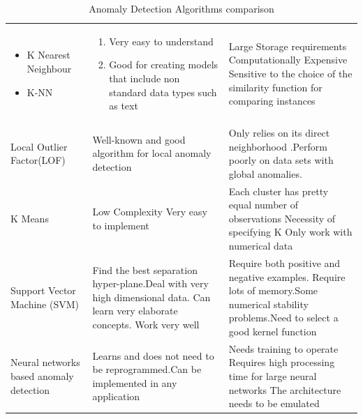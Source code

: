\begin{xltabular}{\textwidth}{@{} >{\raggedright\arraybackslash}X X X @{}} 
	\caption{Anomaly Detection Algorithms comparison\label{tab:algorithm_comp} \protect \cite{silviavalcheva} }\\
	
	\toprule      
	   &   &  \\ \midrule
	\begin{itemize}%
		\item K Nearest Neighbour
		\item K-NN
	\end{itemize}   & \begin{enumerate}
		\item Very easy to understand 
		\item Good for creating models that include non standard data types such as
		text
	\end{enumerate}       & Large Storage requirements
	Computationally Expensive
	Sensitive to the choice of the similarity function for comparing instances             \\ \midrule
	Local Outlier Factor(LOF)  & Well-known and good algorithm
	for local anomaly detection
	& Only relies on its direct neighborhood .\newline Perform poorly on data sets with global anomalies. \\ \midrule
	K Means       & Low Complexity \newline Very easy to implement & Each cluster has pretty equal number of observations \newline Necessity of specifying K \newline Only work with numerical data \\ \midrule
	Support Vector Machine (SVM) & Find the best separation hyper-plane.Deal with very high dimensional data.\newline 
	Can learn very elaborate concepts.
	Work very well         & Require both positive and negative examples. Require lots of memory.\newline Some numerical stability problems.Need to select a good kernel function   \\ \midrule
	Neural networks based anomaly detection & Learns and does not need to be reprogrammed.\newline Can be implemented in any application  &    Needs training to operate \newline Requires high processing time for large neural networks \newline The architecture needs to be emulated          \\ \bottomrule
	
\end{xltabular}
